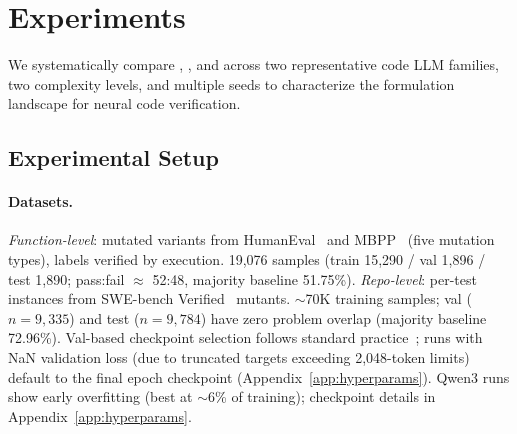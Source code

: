 \section{Experiments}
\label{sec:experiments}

We systematically compare \cls{}, \cwm{}, and \traj{} across two representative code LLM families, two complexity levels, and multiple seeds to characterize the formulation landscape for neural code verification.

\subsection{Experimental Setup}
\label{sec:setup}

\paragraph{Datasets.}
\emph{Function-level}: mutated variants from HumanEval~\cite{chen2021humaneval} and MBPP~\cite{austin2021mbpp} (five mutation types), labels verified by execution. 19,076 samples (train 15,290 / val 1,896 / test 1,890; pass:fail $\approx$ 52:48, majority baseline 51.75\%).
\emph{Repo-level}: per-test instances from SWE-bench Verified~\cite{chowdhury2024swebenchverified} mutants. ${\sim}$70K training samples; val ($n{=}9{,}335$) and test ($n{=}9{,}784$) have zero problem overlap (majority baseline 72.96\%). Val-based checkpoint selection follows standard practice~\cite{jimenez2024swebench}; runs with NaN validation loss (due to truncated targets exceeding 2,048-token limits) default to the final epoch checkpoint (Appendix~\ref{app:hyperparams}). Qwen3 \cwm{} runs show early overfitting (best at ${\sim}$6\% of training); checkpoint details in Appendix~\ref{app:hyperparams}.

